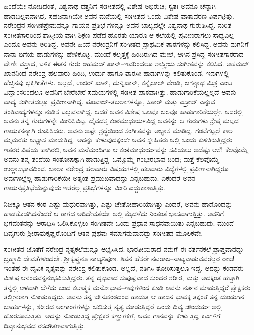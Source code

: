 ಹಿಂದೆಯೇ ನೋಡಿದಂತೆ, ವಿಶ್ವನಾಥ ದತ್ತನಿಗೆ ಸಂಗೀತದಲ್ಲಿ ವಿಶೇಷ ಅಭಿರುಚಿ; ಸ್ವತಃ ಅವನೂ ಚೆನ್ನಾಗಿ ಹಾಡಬಲ್ಲವನಾಗಿದ್ದ. ಸಹಜವಾಗಿಯೇ ಅವನ ಮನೆಯಲ್ಲಿ ಸಂಗೀತದ ಒಂದು ವಿಶೇಷ ವಾತಾವರಣ ಏರ್ಪಟ್ಟಿತ್ತು. ನರೇಂದ್ರನ ಸಂಗೀತಪ್ರೇಮವನ್ನೂ ಗಾಯನ ಪ್ರತಿಭೆ ಗಳನ್ನೂ ಅವನ ಬಾಲ್ಯದಲ್ಲೇ ವಿಶ್ವನಾಥ ಗುರುತಿಸಿದ್ದ. ನುರಿತ ಸಂಗೀತಗಾರರಿಂದ ಶಾಸ್ತ್ರೀಯ ವಾಗಿ ಶಿಕ್ಷಣ ಪಡೆದ ಹೊರತು ಯಾರೂ ಆ ಕಲೆಯಲ್ಲಿ ಪ್ರವೀಣರಾಗಲು ಸಾಧ್ಯವಿಲ್ಲ ಎಂದೂ ಅವನು ಅರಿತಿದ್ದ. ಅವನೇ ಹಿಂದೆ ನರೇಂದ್ರನಿಗೆ ಸಂಗೀತದ ಪ್ರಾಥಮಿಕ ಪಾಠಗಳನ್ನು ಕಲಿಸಿದ್ದ. ಅವನು ಮಗನಿಗೆ ನಾನಾ ಬಗೆಯ ಹಾಡುಗಳನ್ನು ಹೇಳಿಕೊಟ್ಟ. ಮುಂದೆ ಕಲ್ಕತ್ತಕ್ಕೆ ಹಿಂದಿರುಗಿದ ಮೇಲೆ, ಆಗಿನ ಪ್ರಸಿದ್ಧ ಸಂಗೀತಗಾರರಾದ ವೇಣೀ ವಸ್ತಾದ, ಬಳಿಕ ಈತನ ಗುರು ಅಹಮದ್ ಖಾನ್–ಇವರಿಂದಲೂ ಶಾಸ್ತ್ರೀಯ ಸಂಗೀತವನ್ನು ಕಲಿಸಿದ. ಅಹಮದ್ ಖಾನನಿಂದ ನರೇಂದ್ರ ಹಲವಾರು ಹಿಂದಿ, ಉರ್ದು ಹಾಗೂ ಪಾರಸೀ ಹಾಡುಗಳನ್ನು ಕಲಿತುಕೊಂಡ. ಇವುಗಳಲ್ಲಿ ಹೆಚ್ಚಿನವು ಭಕ್ತಿಗೀತೆಗಳು. ಅಲ್ಲದೆ, ಉಜಿರ್ ಖಾನ್, ದುನ್ನಿಖಾನ್, ಕನ್ನೈಲಾಲ್ ಧೇಂಡಿ, ಜಗನ್ನಾಥ ಮಿಶ್ರ ಎಂಬ ವಿದ್ವಾಂಸರಿಂದಲೂ ಅವನಿಗೆ ಬೇರೆಬೇರೆ ಸಮಯಗಳಲ್ಲಿ ಸಂಗೀತ ಪಾಠವಾಗಿತ್ತು. ಹಾಡುಗಾರಿಕೆಯಲ್ಲಲ್ಲದೆ ಅವನು ವಾದ್ಯ ಸಂಗೀತದಲ್ಲೂ ಪ್ರವೀಣನಾಗಿದ್ದ. ಪಖವಾಜ್-ತಬಲಾಗಳನ್ನೂ, ಸಿತಾರ್ ಮತ್ತು ಎಸ್ರಾಜ್ ಎನ್ನುವ ತಂತಿವಾದ್ಯಗಳನ್ನೂ ನುಡಿಸ ಬಲ್ಲವನಾಗಿದ್ದ. ಆದರೆ ಅವನ ವಿಶೇಷ ಒಲವೂ ಬಲವೂ ಹಾಡುಗಾರಿಕೆಯಲ್ಲೇ. ಅದರಲ್ಲಿ ಅವನು ತನ್ನ ಗುರುಗಳನ್ನೇ ಮೀರಿಸಿಬಿಟ್ಟ. ದೈವದತ್ತ ಕಂಠಮಾಧುರ್ಯವಿದ್ದ ಅವನನ್ನು ಆ ಗುರುಗಳು ಶ್ರೇಷ್ಠ ಮಟ್ಟದ ಗಾಯಕನನ್ನಾಗಿ ರೂಪಿಸಿದರು. ಅವನು ಅಷ್ಟೇ ಶ್ರದ್ಧೆಯಿಂದ ಸಂಗೀತವನ್ನು ಅಭ್ಯಾಸ ಮಾಡಿದ್ದ. ಗಂಟೆಗಟ್ಟಲೆ ಕಾಲ ಮೈಮರೆತು ಅಭ್ಯಾಸ ಮಾಡುತ್ತಿದ್ದ. ಅದನ್ನು ಕೇಳುವುದಕ್ಕೆಂದೇ ಅವನ ಸ್ನೇಹಿತರು ಅಲ್ಲಿ ಬಂದು ಕುಳಿತಿರುತ್ತಿದ್ದರು. ಇತರರ ವಿಷಯ ಹಾಗಿರಲಿ, ಅವನ ಮನೆಮಂದಿಗೂ ಆ ಕಂಠಮಾಧುರ್ಯವನ್ನು ಸವಿಯಲು ಅದೆಷ್ಟು ಆಸೆ! ಕೆಲವೊಮ್ಮೆ ಅವನು ತನ್ನ ತಂದೆಯ ಸಂತೋಷಕ್ಕಾಗಿ ಹಾಡುತ್ತಿದ್ದ–ಒಮ್ಮೊಮ್ಮೆ ಗಂಭೀರಭಾವ ದಿಂದ; ಮತ್ತೆ ಕೆಲವೊಮ್ಮೆ ಉಲ್ಲಾಸಭಾವದಿಂದ. ಬಾಲಕ ನರೇಂದ್ರ ಹಲವಾರು ವಿಷಯಗಳಲ್ಲಿ ಹಲವಾರು ವಿದ್ಯೆಗಳಲ್ಲಿ ಪ್ರವೀಣನಾಗಿದ್ದರೂ ಅವುಗಳಲ್ಲೆಲ್ಲ ಹಾಡುಗಾರಿಕೆಯೇ ಅತ್ಯಂತ ಪ್ರಮುಖವಾದದ್ದು ಎನ್ನಬಹುದು. ಏಕೆಂದರೆ ಅವನ ಗಾಯನಪ್ರತಿಭೆಯೆನ್ನುವುದು ಇತರೆಲ್ಲ ಪ್ರತಿಭೆಗಳನ್ನೂ ಮೀರಿ ಎದ್ದುಕಾಣುತ್ತಿತ್ತು.

ನಿಜಕ್ಕೂ ಆತನ ಕಂಠ ಎಷ್ಟು ಮಧುರವಾಗಿತ್ತು, ಎಷ್ಟು ಚೇತೋಹಾರಿಯಾಗಿತ್ತು ಎಂದರೆ, ಅವನು ಹಾಡೊಂದನ್ನು ಹಾಡತೊಡಗಿದನೆಂದರೆ ಆ ರಾಗದ ಅಧಿದೇವತೆಯೇ ಅಲ್ಲಿ ಮೈದಳೆದು ನಿಂತಂತೆ ಭಾಸವಾಗುತ್ತಿತ್ತು. ಅವನಿಗೆ ಭಗವಂತನನ್ನು ಆರಾಧಿಸಿ ಒಲಿಸಿಕೊಳ್ಳಲು ಸಂಗೀತವೇ ಒಂದು ಪ್ರಧಾನ ಸಾಧನವಾಯಿತು ಎನ್ನಬಹುದು. ಮುಂದೆ ದಿವ್ಯಗುರು ಶ್ರೀರಾಮಕೃಷ್ಣರೊಂದಿಗೆ ಆತನ ಪ್ರಥಮ ಸಮಾಗಮವಾದದ್ದು ಸಂಗೀತದ ಮೂಲಕವೇ.

ಸಂಗೀತದ ಜೊತೆಗೆ ನರೇಂದ್ರ ನೃತ್ಯಕಲೆಯನ್ನೂ ಅಭ್ಯಸಿಸಿದ. ಭಾರತೀಯರಾದ ನಮಗೆ ಈ ನರ್ತನಕಲೆ ಪ್ರಾಪ್ತವಾದದ್ದು ಬ್ರಹ್ಮಾದಿ ದೇವತೆಗಳಿಂದಲೇ. ಶ್ರೀಕೃಷ್ಣನೂ ನಾಟ್ಯನಿಪುಣ. ಶಿವನ ಹೆಸರೇ ನಟರಾಜ–ನಾಟ್ಯವಾಡುವವರೆಲ್ಲರ ರಾಜ! ಇಂತಹ ಈ ದೈವಿಕ ನೃತ್ಯವನ್ನು ನರೇಂದ್ರ ಕಲಿತುಕೊಂಡ. ಅಲ್ಲದೆ, ನರ್ತಿಸಿ ತೋರಿಸುತ್ತಲೂ ಇದ್ದ. ಅದನ್ನು ಕಂಡವರು ವಿಶೇಷ ಆನಂದವನ್ನನುಭವಿಸುತ್ತಿದ್ದರು. ತನ್ನ ದೃಢವಾದ ಸುಪುಷ್ಟವಾದ ಸುಂದರ ಶರೀರ, ಮತ್ತು ಅದಕ್ಕಿಂತ ಹೆಚ್ಚಾಗಿ ತನ್ನಲ್ಲಿ ಆಳವಾಗಿ ಬೆಳೆದು ಬಂದ ಕಲಾತ್ಮಕ ಮನೋಭಾವ–ಇವುಗಳಿಂದ ಕೂಡಿ ಅವನು ನರ್ತನ ಮಾಡುತ್ತಿದ್ದರೆ ಪ್ರೇಕ್ಷಕರು ತಲ್ಲೀನರಾಗಿ ನೋಡುತ್ತಿದ್ದರು. ಅವನು ತನ್ನ ಜೇನುಕಂಠದಿಂದ ಹಾಡುತ್ತ ಆ ಹಾಡಿನ ಭಾವಕ್ಕೆ ತಕ್ಕಂತೆ ತನ್ನ ದುಂಡುಗಿನ ಬಾಹುಗಳನ್ನು, ಶರೀರದ ಅಂಗಾಂಗಗಳನ್ನು ಚಲಿಸುತ್ತ ನೃತ್ಯ ಮಾಡುತ್ತಿದ್ದರೆ ಒಂದು ದಿವ್ಯ ಸೌಂದರ್ಯ ಅಲ್ಲಿ ಹೊರಸೂಸುತ್ತಿತ್ತು. ಅದನ್ನು ನೋಡುತ್ತಿದ್ದ ಪ್ರೇಕ್ಷಕರ ಕಣ್ಣುಗಳಿಗೆ, ಅವನ ಗಾನವನ್ನು ಕೇಳು ತ್ತಿದ್ದ ಕಿವಿಗಳಿಗೆ ದಿವ್ಯಾನುಭವದ ರಸದೌತಣವಾಗುತ್ತಿತ್ತು.

